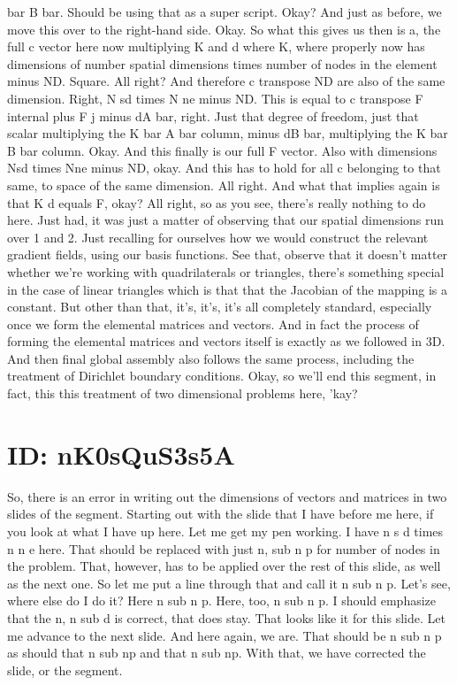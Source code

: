\documentclass[10pt]{article}
\begin{document}
bar B bar. Should be using that as a super script. Okay? And just as before, we move this over to the right-hand side. Okay. So what this gives us then is a, the full c vector here now multiplying K and d where K, where properly now has dimensions of number spatial dimensions times number of nodes in the element minus ND. Square. All right? And therefore c transpose ND are also of the same dimension. Right, N sd times N ne minus ND. This is equal to c transpose F internal plus F j minus dA bar, right. Just that degree of freedom, just that scalar multiplying the K bar A bar column, minus dB bar, multiplying the K bar B bar column. Okay. And this finally is our full F vector. Also with dimensions Nsd times Nne minus ND, okay. And this has to hold for all c belonging to that same, to space of the same dimension. All right. And what that implies again is that K d equals F, okay? All right, so as you see, there's really nothing to do here. Just had, it was just a matter of observing that our spatial dimensions run over 1 and 2. Just recalling for ourselves how we would construct the relevant gradient fields, using our basis functions. See that, observe that it doesn't matter whether we're working with quadrilaterals or triangles, there's something special in the case of linear triangles which is that that the Jacobian of the mapping is a constant. But other than that, it's, it's, it's all completely standard, especially once we form the elemental matrices and vectors. And in fact the process of forming the elemental matrices and vectors itself is exactly as we followed in 3D. And then final global assembly also follows the same process, including the treatment of Dirichlet boundary conditions. Okay, so we'll end this segment, in fact, this this treatment of two dimensional problems here, 'kay?

\section*{ID: nK0sQuS3s5A}
So, there is an error in writing out the dimensions of vectors and matrices in two slides of the segment. Starting out with the slide that I have before me here, if you look at what I have up here. Let me get my pen working. I have n s d times n n e here. That should be replaced with just n, sub n p for number of nodes in the problem. That, however, has to be applied over the rest of this slide, as well as the next one. So let me put a line through that and call it n sub n p. Let's see, where else do I do it? Here n sub n p. Here, too, n sub n p. I should emphasize that the n, n sub d is correct, that does stay. That looks like it for this slide. Let me advance to the next slide. And here again, we are. That should be n sub n p as should that n sub np and that n sub np. With that, we have corrected the slide, or the segment.
\end{document}
